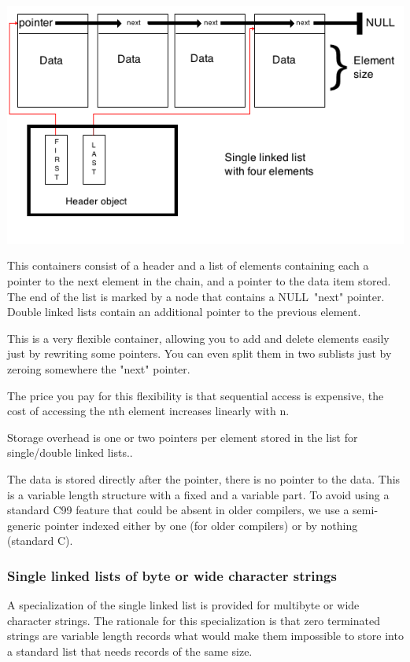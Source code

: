 \documentclass[12pt,a4paper]{memoir} %
\newif\iftth
\newcommand{\Null}{{\iftth \ NULL \else \footnotesize NULL\  \fi}}
\begin{document}
\includegraphics[scale=0.63]{SingleLinkedList.png}

This containers consist of a header and a list of elements containing each a pointer to the next element in the chain, and a pointer to the data item 
stored. The end of the list is marked by a node that contains a \Null "next" pointer. Double linked lists contain an additional pointer to the previous 
element.

This is a very flexible container, allowing you to add and delete elements easily just by rewriting some pointers. You can even split them in two 
sublists just by zeroing somewhere the "next" pointer.

The price you pay for this flexibility is that sequential access is expensive, the cost of accessing the nth element increases linearly with n.

Storage overhead is one or two pointers per element stored in the list for single/double linked lists..

The data is stored directly after the pointer, there is no pointer to the data. This is a variable length structure with a fixed and a variable part. 
To avoid using a standard C99 feature that could be absent in older compilers, we use a semi-generic pointer indexed either by one (for older compilers) or by nothing (standard C).

\subsubsection{Single linked lists of byte or wide character strings}
A specialization of the single linked list is provided for multibyte or wide character strings. The rationale for this specialization is that
zero terminated strings are variable length records what would make them impossible to store into a standard list that needs records of the
same size.
\end{document}
